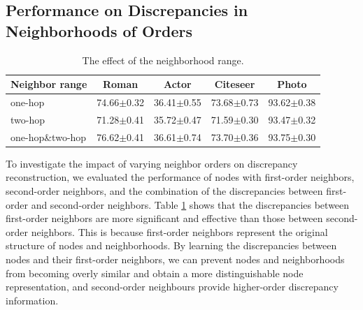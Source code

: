 \documentclass[sigconf]{acmart}
\begin{document}
\subsection{Performance on Discrepancies in Neighborhoods of Orders}
\begin{table}
\small
\renewcommand{\arraystretch}{1.2}
\renewcommand{\tabcolsep}{1.9pt}    
\label{table-operators}
\caption{The effect of the neighborhood range.}
\begin{tabular}{l|c c c c}
\toprule
Neighbor range  & Roman & Actor &Citeseer&Photo  \\
\midrule
one-hop & 74.66$\pm$0.32&36.41$\pm$0.55&73.68$\pm$0.73&93.62$\pm$0.38   \\
two-hop & 71.28$\pm$0.41&35.72$\pm$0.47&71.59$\pm$0.30&93.47$\pm$0.32\\
one-hop\&two-hop & 76.62$\pm$0.41&36.61$\pm$0.74&73.70$\pm$0.36&93.75$\pm$0.30\\ 
\bottomrule
\end{tabular}
\label{neighbor_range}
\end{table}

To investigate the impact of varying neighbor orders on discrepancy reconstruction, we evaluated the performance of nodes with first-order neighbors, second-order neighbors, and the combination of the discrepancies between first-order and second-order neighbors. Table \ref{neighbor_range} shows that the discrepancies between first-order neighbors are more significant and effective than those between second-order neighbors. This is because first-order neighbors represent the original structure of nodes and neighborhoods. By learning the discrepancies between nodes and their first-order neighbors, we can prevent nodes and neighborhoods from becoming overly similar and obtain a more distinguishable node representation, and second-order neighbours provide higher-order discrepancy information.


      
\end{document}
